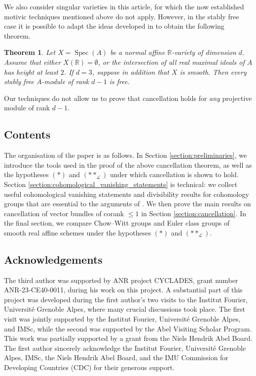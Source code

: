 \documentclass[11pt,leqno]{amsart}
\newcommand{\Spec}{\operatorname{Spec}}
\renewcommand{\1}{{\rm 1\hspace*{-0.4ex}%
\rule{0.1ex}{1.52ex}\hspace*{0.2ex}}}
\renewcommand{\Lc}{{\mathcal L}}
\newcommand{\<}[1]{{\langle}#1 {\rangle}}
\newcommand{\Rb}{\mathbb{R}}
\newcounter{intro}
\theoremstyle{plain}
\newtheorem{thmintro}{Theorem}
\theoremstyle{definition}
\theoremstyle{remark}
\numberwithin{equation}{section}
\begin{document}
We also consider singular varieties in this article, for which the now established motivic techniques mentioned above do not apply. However, in the stably free case it is possible to adapt the ideas developed in \cite{faselStablyFreeModules2012} to obtain the following theorem.

\begin{thmintro}
Let $X = \Spec (A)$ be a normal affine $\mathbb{R}$-variety of dimension $d$. Assume that either $X(\mathbb{R}) = \emptyset$, or the intersection of all real maximal ideals of $A$ has height at least $2$. If $d = 3$, suppose in addition that $X$ is smooth. Then every stably free $A$-module of rank $d-1$ is free.
\end{thmintro}

Our techniques do not allow us to prove that cancellation holds for \emph{any} projective module of rank $d-1$.

\subsection*{Contents}

The organisation of the paper is as follows. In Section \ref{section:preliminaries}, we introduce the tools used in the proof of the above cancellation theorem, as well as the hypotheses $(*)$ and $(**_\Lc)$ under which cancellation is shown to hold. 
Section \ref{section:cohomological_vanishing_statements} is technical: we collect useful cohomological vanishing statements and divisibility results for cohomology groups that are essential to the arguments of \cite{faselSuslinsCancellationConjecture2025}. We then prove the main results on cancellation of vector bundles of corank $\leq 1$ in Section \ref{section:cancellation}. In the final section, we compare Chow--Witt groups and Euler class groups of smooth real affine schemes under the hypotheses $(*)$ and $(**_\Lc)$.

\subsection*{Acknowledgements} The third author was supported by ANR project CYCLADES, grant number ANR-23-CE40-0011, during his work on this project. A substantial part of this project was developed during the first author's two visits to the Institut Fourier, Université Grenoble Alpes, where many crucial discussions took place. The first visit was jointly supported by the Institut Fourier, Université Grenoble Alpes, and IMSc, while the second was supported by the Abel Visiting Scholar Program. This work was partially supported by a grant from the Niels Hendrik Abel Board. The first author sincerely acknowledge the Institut Fourier, Université Grenoble Alpes, IMSc, the Niels Hendrik Abel Board, and the IMU Commission for Developing Countries (CDC) for their generous support.
\end{document}
